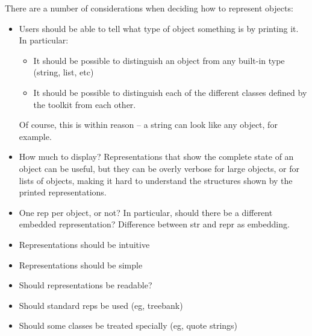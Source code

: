 \documentclass[11pt]{article}
\begin{document}
There are a number of considerations when deciding how to represent
objects:

\begin{itemize}

  \item Users should be able to tell what type of object something is
    by printing it.  In particular:
    \begin{itemize}
      \item It should be possible to distinguish an object from any
        built-in type (string, list, etc)
      \item It should be possible to distinguish each of the different
        classes defined by the toolkit from each other.
    \end{itemize}

    Of course, this is within reason -- a string can look like any
    object, for example.

  \item How much to display?  Representations that show the complete
  state of an object can be useful, but they can be overly verbose for
  large objects, or for lists of objects, making it hard to understand
  the structures shown by the printed representations.

  \item One rep per object, or not?  In particular, should there be a
  different embedded representation?  Difference between str and repr
  as embedding.

  \item Representations should be intuitive

  \item Representations should be simple

  \item Should representations be readable?

  \item Should standard reps be used (eg, treebank)

  \item Should some classes be treated specially (eg, quote strings)

\end{itemize}
\end{document}
